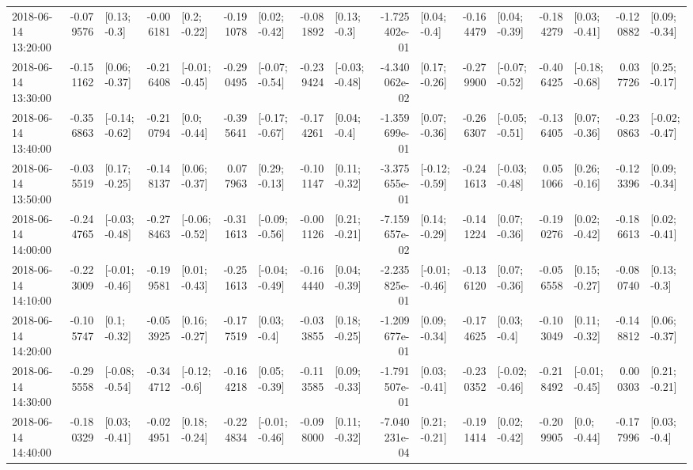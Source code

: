 \begin{tabular}{lrlrlrlrlrlrlrlrl}
2018-06-14 13:20:00 & -0.079576 &    [0.13; -0.3] & -0.006181 &    [0.2; -0.22] & -0.191078 &   [0.02; -0.42] & -0.081892 &    [0.13; -0.3] & -1.725402e-01 &    [0.04; -0.4] & -0.164479 &   [0.04; -0.39] & -0.184279 &   [0.03; -0.41] & -0.120882 &   [0.09; -0.34] \\
2018-06-14 13:30:00 & -0.151162 &   [0.06; -0.37] & -0.216408 &  [-0.01; -0.45] & -0.290495 &  [-0.07; -0.54] & -0.239424 &  [-0.03; -0.48] & -4.340062e-02 &   [0.17; -0.26] & -0.279900 &  [-0.07; -0.52] & -0.406425 &  [-0.18; -0.68] &  0.037726 &   [0.25; -0.17] \\
2018-06-14 13:40:00 & -0.356863 &  [-0.14; -0.62] & -0.210794 &    [0.0; -0.44] & -0.395641 &  [-0.17; -0.67] & -0.174261 &    [0.04; -0.4] & -1.359699e-01 &   [0.07; -0.36] & -0.266307 &  [-0.05; -0.51] & -0.136405 &   [0.07; -0.36] & -0.230863 &  [-0.02; -0.47] \\
2018-06-14 13:50:00 & -0.035519 &   [0.17; -0.25] & -0.148137 &   [0.06; -0.37] &  0.077963 &   [0.29; -0.13] & -0.101147 &   [0.11; -0.32] & -3.375655e-01 &  [-0.12; -0.59] & -0.241613 &  [-0.03; -0.48] &  0.051066 &   [0.26; -0.16] & -0.123396 &   [0.09; -0.34] \\
2018-06-14 14:00:00 & -0.244765 &  [-0.03; -0.48] & -0.278463 &  [-0.06; -0.52] & -0.311613 &  [-0.09; -0.56] & -0.001126 &   [0.21; -0.21] & -7.159657e-02 &   [0.14; -0.29] & -0.141224 &   [0.07; -0.36] & -0.190276 &   [0.02; -0.42] & -0.186613 &   [0.02; -0.41] \\
2018-06-14 14:10:00 & -0.223009 &  [-0.01; -0.46] & -0.199581 &   [0.01; -0.43] & -0.251613 &  [-0.04; -0.49] & -0.164440 &   [0.04; -0.39] & -2.235825e-01 &  [-0.01; -0.46] & -0.136120 &   [0.07; -0.36] & -0.056558 &   [0.15; -0.27] & -0.080740 &    [0.13; -0.3] \\
2018-06-14 14:20:00 & -0.105747 &    [0.1; -0.32] & -0.053925 &   [0.16; -0.27] & -0.177519 &    [0.03; -0.4] & -0.033855 &   [0.18; -0.25] & -1.209677e-01 &   [0.09; -0.34] & -0.174625 &    [0.03; -0.4] & -0.103049 &   [0.11; -0.32] & -0.148812 &   [0.06; -0.37] \\
2018-06-14 14:30:00 & -0.295558 &  [-0.08; -0.54] & -0.344712 &   [-0.12; -0.6] & -0.164218 &   [0.05; -0.39] & -0.113585 &   [0.09; -0.33] & -1.791507e-01 &   [0.03; -0.41] & -0.230352 &  [-0.02; -0.46] & -0.218492 &  [-0.01; -0.45] &  0.000303 &   [0.21; -0.21] \\
2018-06-14 14:40:00 & -0.180329 &   [0.03; -0.41] & -0.024951 &   [0.18; -0.24] & -0.224834 &  [-0.01; -0.46] & -0.098000 &   [0.11; -0.32] & -7.040231e-04 &   [0.21; -0.21] & -0.191414 &   [0.02; -0.42] & -0.209905 &    [0.0; -0.44] & -0.177996 &    [0.03; -0.4] \\

\end{tabular}

